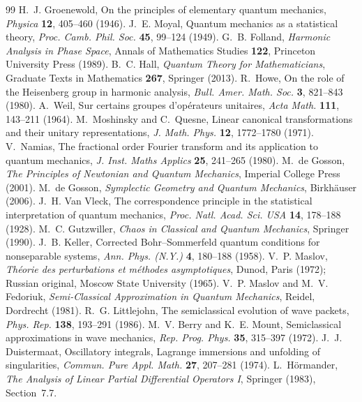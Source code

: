 \documentclass[11pt,a4paper]{article}
\theoremstyle{plain}
\theoremstyle{definition}
\theoremstyle{remark}
\begin{document}
\begin{thebibliography}{99}
 H.~J. Groenewold, On the principles of elementary quantum mechanics, \emph{Physica} \textbf{12}, 405--460 (1946).
 J.~E. Moyal, Quantum mechanics as a statistical theory, \emph{Proc. Camb. Phil. Soc.} \textbf{45}, 99--124 (1949).
 G.~B. Folland, \emph{Harmonic Analysis in Phase Space}, Annals of Mathematics Studies \textbf{122}, Princeton University Press (1989).
 B.~C. Hall, \emph{Quantum Theory for Mathematicians}, Graduate Texts in Mathematics \textbf{267}, Springer (2013).
 R.~Howe, On the role of the Heisenberg group in harmonic analysis, \emph{Bull. Amer. Math. Soc.} \textbf{3}, 821--843 (1980).
 A.~Weil, Sur certains groupes d'op\'erateurs unitaires, \emph{Acta Math.} \textbf{111}, 143--211 (1964).
 M.~Moshinsky and C.~Quesne, Linear canonical transformations and their unitary representations, \emph{J. Math. Phys.} \textbf{12}, 1772--1780 (1971).
 V.~Namias, The fractional order Fourier transform and its application to quantum mechanics, \emph{J. Inst. Maths Applics} \textbf{25}, 241--265 (1980).
 M.~de Gosson, \emph{The Principles of Newtonian and Quantum Mechanics}, Imperial College Press (2001).
 M.~de Gosson, \emph{Symplectic Geometry and Quantum Mechanics}, Birkh\"auser (2006).
 J.~H. Van Vleck, The correspondence principle in the statistical interpretation of quantum mechanics, \emph{Proc. Natl. Acad. Sci. USA} \textbf{14}, 178--188 (1928).
 M.~C. Gutzwiller, \emph{Chaos in Classical and Quantum Mechanics}, Springer (1990).
 J.~B. Keller, Corrected Bohr--Sommerfeld quantum conditions for nonseparable systems, \emph{Ann. Phys. (N.Y.)} \textbf{4}, 180--188 (1958).
 V.~P. Maslov, \emph{Th\'eorie des perturbations et m\'ethodes asymptotiques}, Dunod, Paris (1972); Russian original, Moscow State University (1965).
 V.~P. Maslov and M.~V. Fedoriuk, \emph{Semi-Classical Approximation in Quantum Mechanics}, Reidel, Dordrecht (1981).
 R.~G. Littlejohn, The semiclassical evolution of wave packets, \emph{Phys. Rep.} \textbf{138}, 193--291 (1986).
 M.~V. Berry and K.~E. Mount, Semiclassical approximations in wave mechanics, \emph{Rep. Prog. Phys.} \textbf{35}, 315--397 (1972).
 J.~J. Duistermaat, Oscillatory integrals, Lagrange immersions and unfolding of singularities, \emph{Commun. Pure Appl. Math.} \textbf{27}, 207--281 (1974).
 L.~H\"ormander, \emph{The Analysis of Linear Partial Differential Operators I}, Springer (1983), Section~7.7.

\end{thebibliography}
\end{document}

